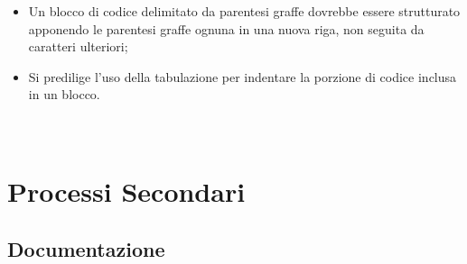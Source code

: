 \documentclass[a4paper, 12pt]{article}
\begin{document}
\begin{itemize}
    \item Un blocco di codice delimitato da parentesi graffe dovrebbe essere strutturato apponendo le parentesi graffe ognuna in una nuova riga, non seguita da caratteri ulteriori;
    \item Si predilige l'uso della tabulazione per indentare la porzione di codice inclusa in un blocco.
\paragraph{}\\
\end{itemize}
\newpage

\section{Processi Secondari}
\subsection{Documentazione}
\end{document}
